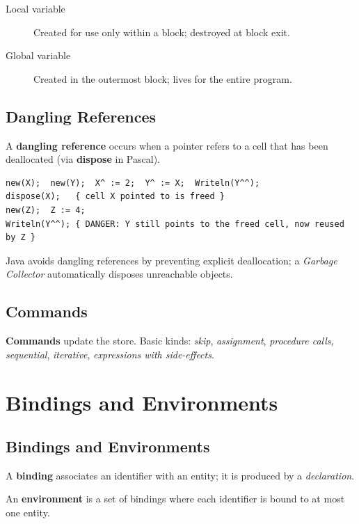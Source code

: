 \documentclass[12pt,a4paper]{article}
\begin{document}
\begin{description}
  \item[Local variable] Created for use only within a block; destroyed at block exit.
  \item[Global variable] Created in the outermost block; lives for the entire program.
\end{description}

\subsection{Dangling References}

A \textbf{dangling reference} occurs when a pointer refers to a cell that has been
deallocated (via \textbf{dispose} in Pascal).

\begin{lstlisting}[style=pascal,numbers=none]
new(X);  new(Y);  X^ := 2;  Y^ := X;  Writeln(Y^^);
dispose(X);   { cell X pointed to is freed }
new(Z);  Z := 4;
Writeln(Y^^); { DANGER: Y still points to the freed cell, now reused by Z }
\end{lstlisting}

Java avoids dangling references by preventing explicit deallocation; a
\emph{Garbage Collector} automatically disposes unreachable objects.

\subsection{Commands}

\textbf{Commands} update the store.
Basic kinds: \emph{skip}, \emph{assignment}, \emph{procedure calls},
\emph{sequential}, \emph{iterative}, \emph{expressions with side-effects}.

\section{Bindings and Environments}

\subsection{Bindings and Environments}

A \textbf{binding} associates an identifier with an entity; it is produced by a
\emph{declaration}.

An \textbf{environment} is a set of bindings where each identifier is bound to at most one entity.
\end{document}

